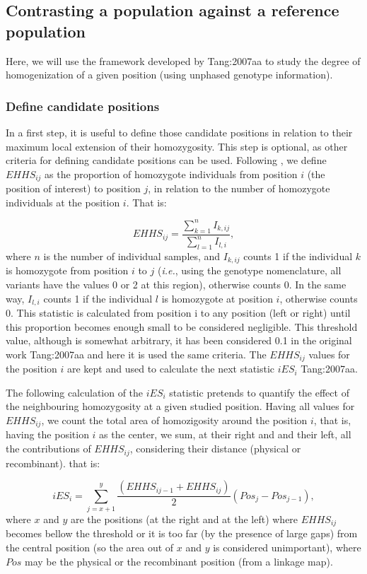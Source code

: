 \documentclass[a4paper,11pt]{article}
\begin{document}
\subsection{Contrasting a population against a reference population}
Here, we will use the framework developed by {Tang:2007aa} to study the degree of homogenization of a given position (using unphased genotype information).
\subsubsection{Define candidate positions}
 In a first step, it is useful to define those candidate positions in relation to their maximum local extension of their homozygosity. This step is optional, as other criteria for defining candidate positions can be used. Following \citep{Tang:2007aa}, we define $EHHS_{ij}$ as the proportion of homozygote individuals from position $i$ (the position of interest) to position $j$, in relation to the number of homozygote individuals at the position $i$. That is:
 
 \begin{equation}
 EHHS_{ij} = \frac{\sum_{k=1}^{n}I_{k,ij}}{\sum_{l=1}^{n}I_{l,i}},
 \end{equation}
where $n$ is the number of individual samples, and $I_{k,ij}$ counts 1 if the individual $k$ is homozygote from position $i$ to $j$ (\textit{i.e.}, using the genotype nomenclature, all variants have the values 0 or 2 at this region), otherwise counts 0. In the same way, $I_{l,i}$ counts 1 if the individual $l$ is homozygote at position $i$, otherwise counts 0. This statistic is calculated from position i to any position (left or right) until this proportion becomes enough small to be considered negligible. This threshold value, although is somewhat arbitrary, it has been considered 0.1 in the original work {Tang:2007aa} and here it is used the same criteria. The $EHHS_{ij}$ values for the position $i$ are kept and used to calculate the next statistic $iES_i$ {Tang:2007aa}.

The following calculation of the $iES_i$ statistic pretends to quantify the effect of the neighbouring homozygosity at a given studied position. Having all values for $EHHS_{ij}$, we count the total area of homozigosity around the position $i$, that is, having the position $i$ as the center, we sum, at their right and and their left, all the contributions of $EHHS_{ij}$, considering their distance (physical or recombinant). that is: 

 \begin{equation}
 iES_i = \sum_{j=x+1}^{y}\frac{(EHHS_{ij-1} + EHHS_{ij})}{2} (Pos_{j} - Pos_{j-1}),
 \end{equation}
where $x$ and $y$ are the positions (at the right and at the left) where $EHHS_{ij}$ becomes bellow the threshold or it is too far (by the presence of large gaps) from the central position (so the area out of $x$ and $y$ is considered unimportant), where $Pos$ may be the physical or the recombinant position (from a linkage map).
 
\end{document}
